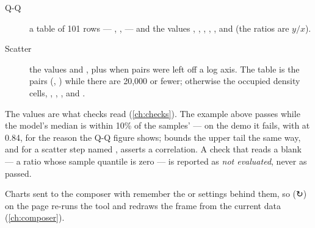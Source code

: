 \begin{description}
\item[Q-Q] a table of 101 rows — , ,  — and the values , , , , ,  and  (the ratios are $y/x$).
\item[Scatter] the values  and , plus  when pairs were left off a log axis. The table is the pairs (, ) while there are 20,000 or fewer; otherwise the occupied density cells, , , ,  and .
\end{description}

The values are what checks read (\cref{ch:checks}). The example above passes while the model's median  is within 10\% of the samples' — on the demo it fails, with  at 0.84, for the reason the Q-Q figure shows;  bounds the upper tail the same way, and for a scatter step named ,  asserts a correlation. A check that reads a blank — a ratio whose sample quantile is zero — is reported as \emph{not evaluated}, never as passed.

Charts sent to the composer with  remember the  or  settings behind them, so  (↻) on the page re-runs the tool and redraws the frame from the current data (\cref{ch:composer}).
